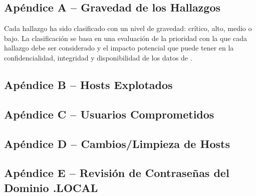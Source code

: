 \subsection{Apéndice A – Gravedad de los Hallazgos}
\qquad Cada hallazgo ha sido clasificado con un nivel de gravedad: crítico, alto, medio o bajo. La clasificación se basa en una evaluación de la prioridad con la que cada hallazgo debe ser considerado y el impacto potencial que puede tener en la confidencialidad, integridad y disponibilidad de los datos de \enterpriseName.

\subsection{Apéndice B – Hosts Explotados}
\subsection{Apéndice C – Usuarios Comprometidos}
\subsection{Apéndice D – Cambios/Limpieza de Hosts}
\subsection{Apéndice E – Revisión de Contraseñas del Dominio \enterpriseName.LOCAL}
